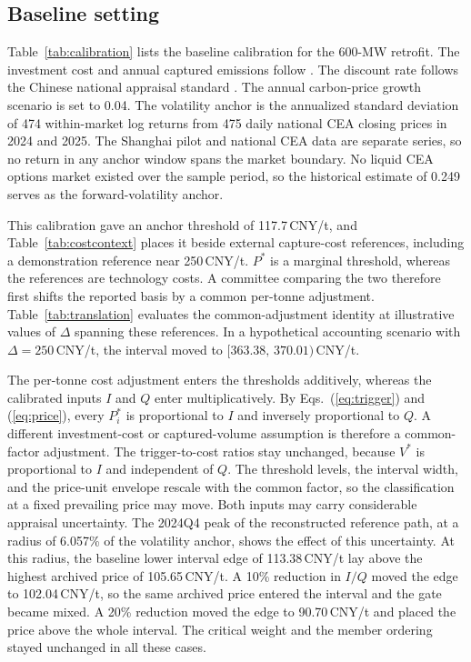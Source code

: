 \documentclass[5p,times,authoryear]{elsarticle}
\theoremstyle{plain}
\begin{document}
\subsection{Baseline setting}

Table~\ref{tab:calibration} lists the baseline calibration for the 600-MW retrofit. The investment cost and annual captured emissions follow \citet{Sun2024}. The discount rate follows the Chinese national appraisal standard \citep{NDRC2006}. The annual carbon-price growth scenario is set to 0.04. The volatility anchor is the annualized standard deviation of 474 within-market log returns from 475 daily national CEA closing prices in 2024 and 2025. The Shanghai pilot and national CEA data are separate series, so no return in any anchor window spans the market boundary. No liquid CEA options market existed over the sample period, so the historical estimate of 0.249 serves as the forward-volatility anchor.

This calibration gave an anchor threshold of 117.7\,CNY/t, and Table~\ref{tab:costcontext} places it beside external capture-cost references, including a demonstration reference near 250\,CNY/t. $P^{*}$ is a marginal threshold, whereas the references are technology costs. A committee comparing the two therefore first shifts the reported basis by a common per-tonne adjustment. Table~\ref{tab:translation} evaluates the common-adjustment identity at illustrative values of $\Delta$ spanning these references. In a hypothetical accounting scenario with $\Delta=250$\,CNY/t, the interval moved to $[363.38,\,370.01)$\,CNY/t.

The per-tonne cost adjustment enters the thresholds additively, whereas the calibrated inputs $I$ and $Q$ enter multiplicatively. By Eqs.~(\ref{eq:trigger}) and (\ref{eq:price}), every $P^{*}_{i}$ is proportional to $I$ and inversely proportional to $Q$. A different investment-cost or captured-volume assumption is therefore a common-factor adjustment. The trigger-to-cost ratios stay unchanged, because $V^{*}$ is proportional to $I$ and independent of $Q$. The threshold levels, the interval width, and the price-unit envelope rescale with the common factor, so the classification at a fixed prevailing price may move. Both inputs may carry considerable appraisal uncertainty. The 2024Q4 peak of the reconstructed reference path, at a radius of 6.057\% of the volatility anchor, shows the effect of this uncertainty. At this radius, the baseline lower interval edge of 113.38\,CNY/t lay above the highest archived price of 105.65\,CNY/t. A 10\% reduction in $I/Q$ moved the edge to 102.04\,CNY/t, so the same archived price entered the interval and the gate became mixed. A 20\% reduction moved the edge to 90.70\,CNY/t and placed the price above the whole interval. The critical weight and the member ordering stayed unchanged in all these cases.
\end{document}

